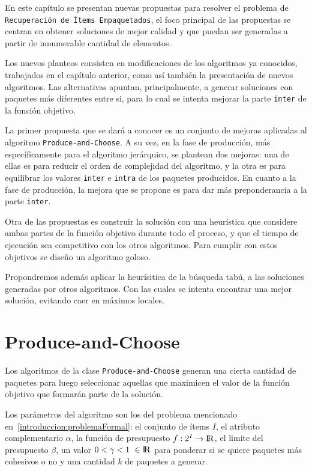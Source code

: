 En este capítulo se presentan nuevas propuestas para resolver el problema de \texttt{\\Recuperación de Ítems Empaquetados}, el foco principal de las propuestas se centran en obtener soluciones de mejor calidad y que puedan ser generadas a partir de innumerable cantidad de elementos. 

Los nuevos planteos consisten en modificaciones de los algoritmos ya conocidos, trabajados en el capítulo anterior, como así también la presentación de nuevos algoritmos. Las alternativas apuntan, principalmente, a generar soluciones con paquetes más diferentes entre si, para lo cual se intenta mejorar la parte \texttt{inter} de la función objetivo.

La primer propuesta que se dará a conocer es un conjunto de mejoras aplicadas al algoritmo \texttt{Produce\allowbreak-and\allowbreak-Choose}. A su vez, en la fase de producción, más específicamente para el algoritmo jerárquico, se plantean dos mejoras: una de ellas es para reducir el orden de complejidad del algoritmo, y la otra es para equilibrar los valores \texttt{inter} e \texttt{intra} de los paquetes producidos. En cuanto a la fase de producción, la mejora que se propone es para dar más preponderancia a la parte \texttt{inter}.

Otra de las propuestas es construir la solución con una heurística que considere ambas partes de la función objetivo durante todo el proceso, y que el tiempo de ejecución sea competitivo con los otros algoritmos. Para cumplir con estos objetivos se diseño un algoritmo goloso.

Propondremos además aplicar la heurísitica de la búsqueda tabú, a las soluciones generadas por otros algoritmos. Con las cuales se intenta encontrar una mejor solución, evitando caer en máximos locales. 

\section{Produce-and-Choose}
Los algoritmos de la clase \texttt{Produce\allowbreak-and\allowbreak-Choose} generan una cierta cantidad de paquetes para luego seleccionar aquellas que maximicen el valor de la función objetivo que formarán parte de la solución.

Los parámetros del algoritmo son los del problema mencionado en~\autoref{introduccion:problemaFormal}: el conjunto de ítems $I$, el atributo complementario $\alpha$, la función de presupuesto $f: 2^{I} \rightarrow \rm I \!R$, el limite del presupuesto $\beta$, un valor $0 < \gamma < 1\ \in \rm I \!R$ para ponderar si se quiere paquetes más cohesivos o no y una cantidad $k$ de paquetes a generar. 

